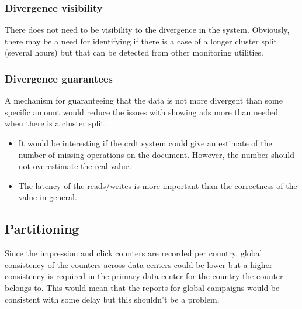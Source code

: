 \documentclass[11pt,a4paper]{report}
\begin{document}
\subsubsection{Divergence visibility}
There does not need to be visibility to the divergence in the system. Obviously, there may be a need for identifying if there is a case of a longer cluster split (several hours) but that can be detected from other monitoring utilities.

\subsubsection{Divergence guarantees}
A mechanism for guaranteeing that the data is not more divergent than some specific amount would reduce the issues with showing ads more than needed when there is a cluster split.

\begin{itemize}
\item It would be interesting if the \gls{crdt} system could give an estimate of the number of missing operations on the document. However, the number should not overestimate the real value.
\item The latency of the reads/writes is more important than the correctness of the value in general.
\end{itemize}

\subsection{Partitioning}
Since the impression and click counters are recorded per country, global consistency of the counters across data centers could be lower but a  higher consistency is required in the primary data center for the country the counter belongs to. This would mean that the reports for global campaigns would be consistent with some delay but this shouldn't be a problem.
\end{document}

